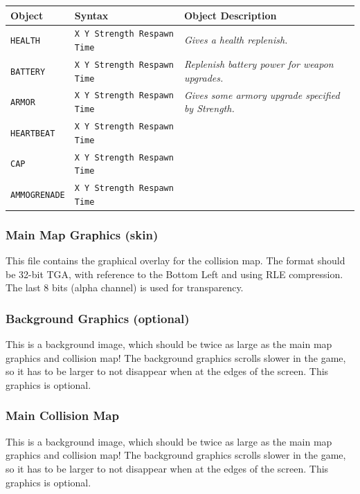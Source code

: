 \documentclass[a5paper, 10pt, titlepage, landscape, twoside, final]{article}
\begin{document}
\begin{table}[ht]
  \small
  \begin{tabular}{lll}
    \textbf{Object} & \textbf{Syntax} & \textbf{Object Description}\\
    \hline
    \hline
    \texttt{HEALTH} & \texttt{X Y Strength Respawn Time} & \textit{Gives a health replenish.} \\
    \texttt{BATTERY} & \texttt{X Y Strength Respawn Time} & \textit{Replenish battery power for weapon upgrades.} \\
    \texttt{ARMOR} & \texttt{X Y Strength Respawn Time} & \textit{Gives some armory upgrade specified by Strength.} \\
    \texttt{HEARTBEAT} & \texttt{X Y Strength Respawn Time} & \textit{} \\
    \texttt{CAP} & \texttt{X Y Strength Respawn Time} & \textit{} \\
    \texttt{AMMOGRENADE} & \texttt{X Y Strength Respawn Time} & \textit{} \\
  \end{tabular}
\end{table}



\clearpage
\subsubsection{Main Map Graphics (skin)}
This file contains the graphical overlay for the collision map. The format should be 32-bit TGA, with reference to the Bottom Left and using RLE compression. The last 8 bits (alpha channel) is used for transparency.

\subsubsection{Background Graphics (optional)}
This is a background image, which should be twice as large as the main map graphics and collision map! The background graphics scrolls slower in the game, so it has to be larger to not disappear when at the edges of the screen. This graphics is optional.

\subsubsection{Main Collision Map}
This is a background image, which should be twice as large as the main map graphics and collision map! The background graphics scrolls slower in the game, so it has to be larger to not disappear when at the edges of the screen. This graphics is optional.
\end{document}

